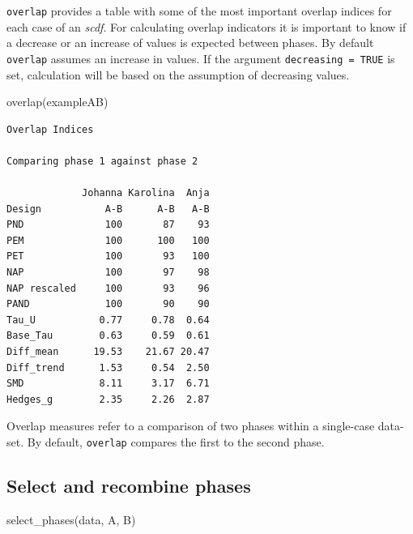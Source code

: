\documentclass[
  letterpaper,
  DIV=11,
  numbers=noendperiod]{scrreprt}
\newenvironment{Shaded}{\begin{snugshade}}{\end{snugshade}}
\newcommand{\FunctionTok}[1]{\textcolor[rgb]{0.28,0.35,0.67}{#1}}
\newcommand{\NormalTok}[1]{\textcolor[rgb]{0.00,0.23,0.31}{#1}}
\begin{document}
\texttt{overlap} provides a table with some of the most important
overlap indices for each case of an \emph{scdf}. For calculating overlap
indicators it is important to know if a decrease or an increase of
values is expected between phases. By default \texttt{overlap} assumes
an increase in values. If the argument \texttt{decreasing\ =\ TRUE} is
set, calculation will be based on the assumption of decreasing values.

\begin{Shaded}
\begin{Highlighting}[]
\FunctionTok{overlap}\NormalTok{(exampleAB)}
\end{Highlighting}
\end{Shaded}

\begin{verbatim}
Overlap Indices

Comparing phase 1 against phase 2 

             Johanna Karolina  Anja
Design           A-B      A-B   A-B
PND              100       87    93
PEM              100      100   100
PET              100       93   100
NAP              100       97    98
NAP rescaled     100       93    96
PAND             100       90    90
Tau_U           0.77     0.78  0.64
Base_Tau        0.63     0.59  0.61
Diff_mean      19.53    21.67 20.47
Diff_trend      1.53     0.54  2.50
SMD             8.11     3.17  6.71
Hedges_g        2.35     2.26  2.87
\end{verbatim}

Overlap measures refer to a comparison of two phases within a
single-case data-set. By default, \texttt{overlap} compares the first to
the second phase.

\hypertarget{sec-select-phases}{%
\subsection{Select and recombine phases}\label{sec-select-phases}}

\begin{tcolorbox}[enhanced jigsaw, toprule=.15mm, colframe=quarto-callout-tip-color-frame, left=2mm, colback=white, breakable, bottomrule=.15mm, arc=.35mm, rightrule=.15mm, leftrule=.75mm, opacityback=0]
\begin{minipage}[t]{5.5mm}
\textcolor{quarto-callout-tip-color}{\faLightbulb}
\end{minipage}%
\begin{minipage}[t]{\textwidth - 5.5mm}
select\_phases(data, A, B)\end{minipage}%
\end{tcolorbox}
\end{document}
